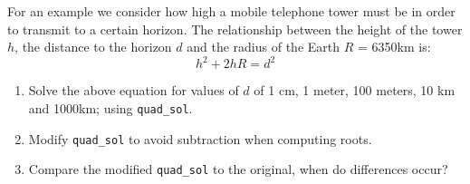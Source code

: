 \documentclass[a4paper,12pt]{article}
\begin{document}
\begin{enumerate}
For an example we consider how high a mobile telephone tower must be in order to transmit to a certain horizon. The relationship between the height of the tower $h$, the distance to the horizon $d$ and the radius of the Earth $R$ = 6350km is:
$$
h^2 + 2hR = d^2
$$
\begin{enumerate}
\item Solve the above equation for values of $d$ of 1 cm, 1 meter, 100 meters, 10 km and 1000km; using {\tt quad\_sol}.
\item Modify {\tt quad\_sol} to avoid subtraction when computing roots.
\item Compare the modified {\tt quad\_sol} to the original, when do differences occur?
\end{enumerate}
\end{enumerate}
\end{document}
